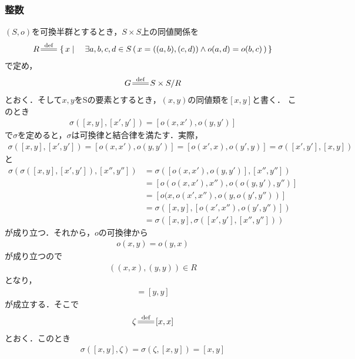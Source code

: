 \subsubsection{整数}
	$(S,o)$を可換半群とするとき，$S \times S$上の同値関係を
	\begin{align}
		R \defeq \Set{x}{\exists a,b,c,d \in S\, (\, x=((a,b),(c,d))
		\wedge o(a,d) = o(b,c)\, )}
	\end{align}
	で定め，
	\begin{align}
		G \defeq S \times S / R
	\end{align}
	とおく．そして$x,y$をSの要素とするとき，$(x,y)$の同値類を$[x,y]$と書く．
	このとき
	\begin{align}
		\sigma \left([x,y],[x',y'] \right) = \left[o(x,x'),o(y,y')\right]
	\end{align}
	で$\sigma$を定めると，$\sigma$は可換律と結合律を満たす．実際，
	\begin{align}
		\sigma \left( [x,y],[x',y'] \right)
		= \left[ o(x,x'), o(y,y') \right]
		= \left[ o(x',x), o(y',y) \right]
		= \sigma \left( [x',y'],[x,y] \right)
	\end{align}
	と
	\begin{align}
		\sigma \left(\sigma \left([x,y],[x',y']\right),[x'',y''] \right)
		&= \sigma \left(\left[ o(x,x'),o(y,y') \right],[x'',y''] \right) \\
		&= \left[ o(o(x,x'),x''), o(o(y,y'),y'') \right] \\
		&= \left[ o(x,o(x',x''), o(y,o(y',y'')) \right] \\
		&= \sigma \left( [x,y], \left[ o(x',x''),o(y',y'') \right] \right) \\
		&= \sigma \left( [x,y], \sigma \left([x',y'],[x'',y'']\right) \right)
	\end{align}
	が成り立つ．それから，$o$の可換律から
	\begin{align}
		o(x,y) = o(y,x)
	\end{align}
	が成り立つので
	\begin{align}
		((x,x),(y,y)) \in R
	\end{align}
	となり，
	\begin{align}
		[x,x] = [y,y]
	\end{align}
	が成立する．そこで
	\begin{align}
		\zeta \defeq [x,x]
	\end{align}
	とおく．このとき
	\begin{align}
		\sigma \left( [x,y],\zeta \right)
		= \sigma \left( \zeta,[x,y] \right)
		= [x,y]
	\end{align}
